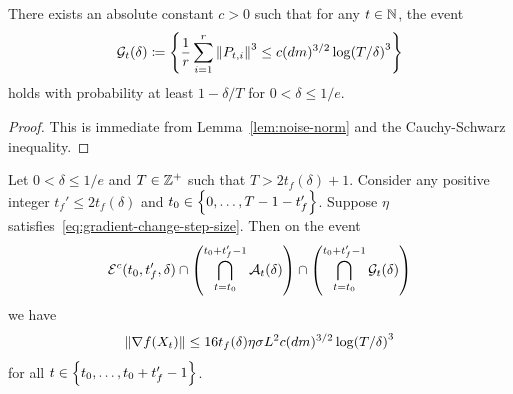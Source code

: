 \begin{lemma}\label{lem:bounded-perturbation-cubes}
    There exists an absolute constant $c > 0$ such that for any $t \in \mathbb{N}$, the event
    \begin{align*}
        \mathcal G_t(\delta) \coloneqq \left\{\frac 1r \sum_{i=1}^r \left\lVert P_{t,i} \right\rVert^3 \leq c (dm)^{3/2} \log(T/\delta)^3\right\}
    \end{align*}
    holds with probability at least $1-\delta/T$ for $0 < \delta \leq 1/e$. 
\end{lemma}
\begin{proof}
    This is immediate from Lemma~\ref{lem:noise-norm} and the Cauchy-Schwarz inequality.
\end{proof}

\begin{lemma}\label{lem:gradient-dominates}
    Let $0 < \delta \leq 1/e$ and $T \in \mathbb{Z}^+$ such that $T > 2t_f(\delta) + 1$. Consider any positive integer $t_f' \leq 2t_f(\delta)$ and $t_0 \in \left\{0, \ldots, T-1-t_f'\right\}$. Suppose $\eta$ satisfies~\eqref{eq:gradient-change-step-size}. Then on the event 
    \begin{align*}
        \mathcal E^c(t_0, t_f', \delta) \cap \qty(\bigcap_{t=t_0}^{t_0+t_f'-1} \mathcal A_t(\delta)) \cap \qty(\bigcap_{t=t_0}^{t_0+t_f'-1} \mathcal G_t(\delta))
    \end{align*}
    we have
    \begin{align*}
        \left\lVert \nabla f(X_t) \right\rVert \leq 16 t_f(\delta) \eta \sigma L^2 c(dm)^{3/2} \log(T/\delta)^3
    \end{align*}
    for all $t \in \left\{t_0, \ldots, t_0+t_f'-1\right\}$. 
\end{lemma}
